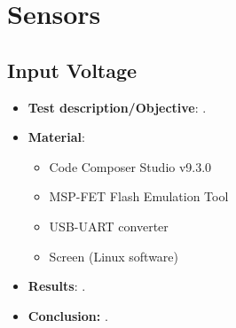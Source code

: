 
%

\section{Sensors}

\subsection{Input Voltage}

\begin{itemize}
    \item \textbf{Test description/Objective}: .
    \item \textbf{Material}:
        \begin{itemize}
            \item Code Composer Studio v9.3.0
            \item MSP-FET Flash Emulation Tool
            \item USB-UART converter
            \item Screen (Linux software)
        \end{itemize}
    \item \textbf{Results}: .
    \item \textbf{Conclusion:} .
\end{itemize}

